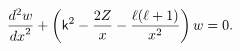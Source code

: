 \[\frac{{d}^{2}w}{{dx}^{2}}+\left({\sf k}^{2}-\frac{2Z}{x}-\frac{\ell(\ell+1)}{x%
^{2}}\right)w=0.\]